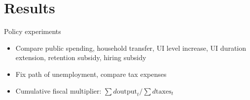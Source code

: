 \documentclass[aspectratio=169]{beamer}
\begin{document}
\section{Results}

\begin{frame}{Policy experiments}
	   \begin{itemize}
            \item Compare public spending, household transfer, UI level increase, UI duration extension, retention subsidy, hiring subsidy
            \item Fix path of unemployment, compare tax expenses
            \item Cumulative fiscal multiplier: $\sum d\text{output}_t/\sum d\text{taxes}_t$  
      \end{itemize}
\end{frame}
\end{document}
